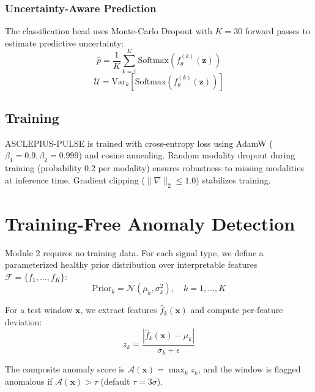 \documentclass[journal]{IEEEtran}
\begin{document}
\subsubsection{Uncertainty-Aware Prediction}
The classification head uses Monte-Carlo Dropout \cite{gal2016dropout} with
$K=30$ forward passes to estimate predictive uncertainty:
\begin{equation}
  \hat{p} = \frac{1}{K}\sum_{k=1}^{K} \text{Softmax}(f_\theta^{(k)}(\mathbf{z}))
\end{equation}
\begin{equation}
  \mathcal{U} = \text{Var}_{k}\!\left[\text{Softmax}(f_\theta^{(k)}(\mathbf{z}))\right]
\end{equation}

\subsection{Training}

ASCLEPIUS-PULSE is trained with cross-entropy loss using AdamW
($\beta_1=0.9, \beta_2=0.999$) and cosine annealing. Random modality dropout
during training (probability 0.2 per modality) ensures robustness to missing
modalities at inference time. Gradient clipping ($\|\nabla\|_2 \leq 1.0$)
stabilizes training.

\section{Training-Free Anomaly Detection}
\label{sec:anomaly}

Module 2 requires no training data. For each signal type, we define a
parameterized healthy prior distribution over interpretable features
$\mathcal{F} = \{f_1, \ldots, f_K\}$:
\begin{equation}
  \text{Prior}_k = \mathcal{N}(\mu_k, \sigma_k^2), \quad k=1,\ldots,K
\end{equation}

For a test window $\mathbf{x}$, we extract features $\hat{f}_k(\mathbf{x})$ and
compute per-feature deviation:
\begin{equation}
  z_k = \frac{|\hat{f}_k(\mathbf{x}) - \mu_k|}{\sigma_k + \epsilon}
\end{equation}

The composite anomaly score is $\mathcal{A}(\mathbf{x}) = \max_k z_k$, and the
window is flagged anomalous if $\mathcal{A}(\mathbf{x}) > \tau$ (default $\tau=3\sigma$).
\end{document}
